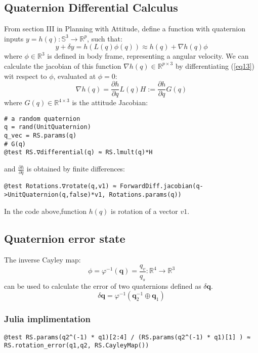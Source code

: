 \subsection{Quaternion Differential Calculus}
From section III in Planning with Attitude\cite{jackson2021planning},
define a function with quaternion inputs $y=h(q): \mathbb{S}^3 \rightarrow \mathbb{R}^p$, such that:
\begin{equation}
    y+\delta y = h(L(q)\phi(q)) \approx h(q) + \nabla h(q)\phi
    \label{eq13}
\end{equation}
where $\phi \in \mathbb{R}^3$ is defined in body frame, representing a angular velocity.
We can calculate the jacobian of this function $\nabla h(q) \in \mathbb{R}^{p \times 3}$ by differentiating (\ref{eq13}) wit respect to $\phi$, evaluated at $\phi = 0$:
\begin{equation}
    \nabla h(q) = \frac{\partial h}{\partial q}L(q)H := \frac{\partial h}{\partial q}G(q)
\end{equation}
where $G(q) \in \mathbb{R}^{4 \times 3}$ is the attitude Jacobian:
\begin{lstlisting}
# a random quaternion
q = rand(UnitQuaternion)
q_vec = RS.params(q)
# G(q)
@test RS.∇differential(q) ≈ RS.lmult(q)*H
\end{lstlisting}
and $\frac{\partial h}{\partial q}$ is obtained by finite differences:
\begin{lstlisting}
@test Rotations.∇rotate(q,v1) ≈ ForwardDiff.jacobian(q->UnitQuaternion(q,false)*v1, Rotations.params(q))
\end{lstlisting}
In the code above,function $h(q)$ is rotation of a vector $v1$.

\subsection{Quaternion error state}
The inverse Cayley map:
\begin{equation}
    \phi = \varphi ^{-1}(\textbf{q}) = \frac{q_v}{q_s} : \mathbb{R}^4 \rightarrow \mathbb{R}^3
\end{equation}
can be used to calculate the error of two quaternions defined as $\delta \textbf{q}$.
\begin{equation}
    \delta\textbf{q} = \varphi ^{-1}(\textbf{q}_2^{-1} \oplus \textbf{q}_1 )
\end{equation}
\subsubsection{Julia implimentation}

\begin{lstlisting}
@test RS.params(q2^(-1) * q1)[2:4] / (RS.params(q2^(-1) * q1)[1] ) ≈ RS.rotation_error(q1,q2, RS.CayleyMap())
\end{lstlisting}

\pagebreak